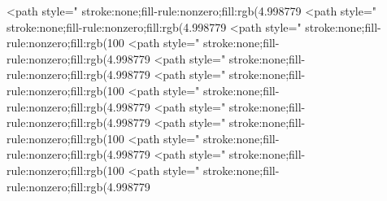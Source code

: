 <path style=" stroke:none;fill-rule:nonzero;fill:rgb(4.998779%
<path style=" stroke:none;fill-rule:nonzero;fill:rgb(4.998779%
<path style=" stroke:none;fill-rule:nonzero;fill:rgb(100%
<path style=" stroke:none;fill-rule:nonzero;fill:rgb(4.998779%
<path style=" stroke:none;fill-rule:nonzero;fill:rgb(4.998779%
<path style=" stroke:none;fill-rule:nonzero;fill:rgb(100%
<path style=" stroke:none;fill-rule:nonzero;fill:rgb(4.998779%
<path style=" stroke:none;fill-rule:nonzero;fill:rgb(4.998779%
<path style=" stroke:none;fill-rule:nonzero;fill:rgb(100%
<path style=" stroke:none;fill-rule:nonzero;fill:rgb(4.998779%
<path style=" stroke:none;fill-rule:nonzero;fill:rgb(100%
<path style=" stroke:none;fill-rule:nonzero;fill:rgb(4.998779%

